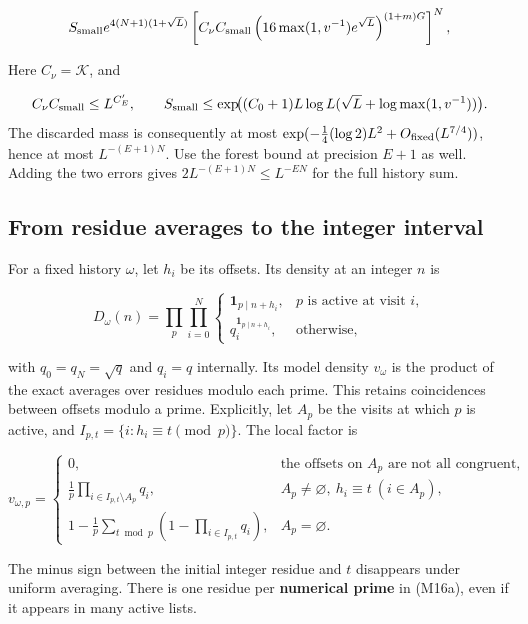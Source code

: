 \[
S_{\rm small}e^{4(N+1)(1+\sqrt L)}
 \left[C_\nu C_{\rm small}
  \left(16\max(1,v^{-1})e^{\sqrt L}\right)^{(1+m)G}\right]^N,
\]

Here \(C_\nu=\mathcal K\), and

\[
C_\nu C_{\rm small}\le L^{C_E'},\qquad
S_{\rm small}\le
 \exp\!\bigl((C_0+1)L\log L(\sqrt L+\log\max(1,v^{-1}))\bigr).
\] The discarded mass is consequently at most
\(\exp(-\tfrac14(\log2)L^2+O_{\rm fixed}(L^{7/4}))\), hence at most
\(L^{-(E+1)N}\). Use the forest bound at precision \(E+1\) as well.
Adding the two errors gives \(2L^{-(E+1)N}\le L^{-EN}\) for the full
history sum.


\hypertarget{marked-correlation-from-residue-averages-to-the-integer-interval}{%
\subsection{From residue averages to the integer
interval}\label{marked-correlation-from-residue-averages-to-the-integer-interval}}

For a fixed history \(\omega\), let \(h_i\) be its offsets. Its density
at an integer \(n\) is

\[
D_\omega(n)=\prod_p\prod_{i=0}^N
\begin{cases}
\mathbf1_{p\mid n+h_i},&p\text{ is active at visit }i,\\
q_i^{\mathbf1_{p\mid n+h_i}},&\text{otherwise},
\end{cases} \tag{M16}
\]

with \(q_0=q_N=\sqrt q\) and \(q_i=q\) internally. Its model density
\(v_\omega\) is the product of the exact averages over residues modulo
each prime. This retains coincidences between offsets modulo a prime.
Explicitly, let \(A_p\) be the visits at which \(p\) is active, and
\(I_{p,t}=\{i:h_i\equiv t\pmod p\}\). The local factor is

\[
v_{\omega,p}=\begin{cases}
0,&\text{the offsets on }A_p\text{ are not all congruent},\\
\displaystyle\frac1p\prod_{i\in I_{p,t}\setminus A_p}q_i,
 &A_p\ne\varnothing,\ h_i\equiv t\ (i\in A_p),\\
\displaystyle1-\frac1p\sum_{t\bmod p}
              \left(1-\prod_{i\in I_{p,t}}q_i\right),&A_p=\varnothing.
\end{cases}\tag{M16a}
\]

The minus sign between the initial integer residue and \(t\) disappears
under uniform averaging. There is one residue per \textbf{numerical
prime} in (M16a), even if it appears in many active lists.

